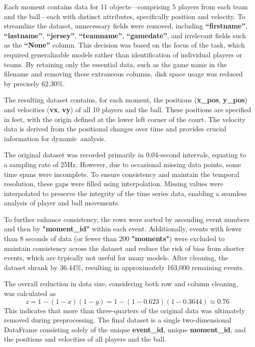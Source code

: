 Each moment contains data for 11 objects—comprising 5 players from each team and the ball—each with distinct attributes, specifically position and velocity. To streamline the dataset, unnecessary fields were removed, including \textbf{``firstname''}, \textbf{``lastname''}, \textbf{``jersey''}, \textbf{``teamname''}, \textbf{``gamedate''}, and irrelevant fields such as the \textbf{``None''} column. This decision was based on the focus of the task, which required generalizable models rather than identification of individual players or teams. By retaining only the essential data, such as the game name in the filename and removing these extraneous columns, disk space usage was reduced by precisely \(62.30\%\).

The resulting dataset contains, for each moment, the positions (\textbf{x\_pos}, \textbf{y\_pos}) and velocities (\textbf{vx}, \textbf{vy}) of all 10 players and the ball. These positions are specified in feet, with the origin defined at the lower left corner of the court. The velocity data is derived from the positional changes over time and provides crucial information for dynamic~analysis.

The original dataset was recorded primarily in 0.04-second intervals, equating to a sampling rate of 25Hz. However, due to occasional missing data points, some time spans were incomplete. To ensure consistency and maintain the temporal resolution, these gaps were filled using interpolation. Missing values were interpolated to preserve the integrity of the time series data, enabling a seamless analysis of player and ball movements.

To further enhance consistency, the rows were sorted by ascending event numbers and then by \textbf{"moment\_id"} within each event. Additionally, events with fewer than 8 seconds of data (or fewer than 200 \textbf{"moments"}) were excluded to maintain consistency across the dataset and reduce the risk of bias from shorter events, which are typically not useful for many models. After cleaning, the dataset shrank by 36.44\%, resulting in approximately 163,000 remaining events.

The overall reduction in data size, considering both row and column cleaning, was calculated as 
\[
z = 1 - (1 - x)(1 - y) = 1 - (1 - 0.623)(1 - 0.3644) \approx 0.76 
\]
This indicates that more than three-quarters of the original data was ultimately removed during preprocessing. The final dataset is a single two-dimensional DataFrame consisting solely of the unique \textbf{event\_id}, unique \textbf{moment\_id}, and the positions and velocities of all players and the ball.

